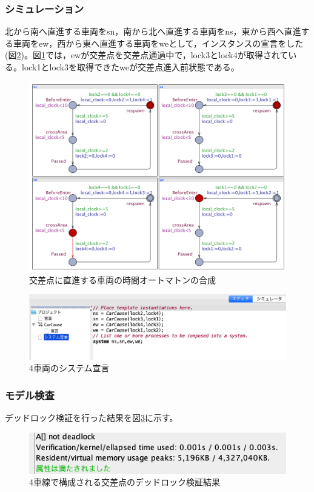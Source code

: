 \documentclass{tpu-sotu}
\begin{document}
	\subsubsection{シミュレーション}
	北から南へ直進する車両をsn，南から北へ直進する車両をns，東から西へ直進する車両をew，西から東へ直進する車両をweとして，インスタンスの宣言をした(図\ref{newsSD})。図\ref{newsS}では，ewが交差点を交差点通過中で，lock3とlock4が取得されている。lock1とlock3を取得できたweが交差点進入前状態である。
	\begin{figure}[htbp]
	\centering
	\includegraphics[width=130mm]{newsSimu.png}
	\caption{交差点に直進する車両の時間オートマトンの合成}
	\label{newsS}
	\end{figure}
	\begin{figure}[htbp]
	\centering
	\includegraphics[width=130mm]{newsSD.png}
	\caption{4車両のシステム宣言}
	\label{newsSD}
	\end{figure}
	\subsubsection{モデル検査}
	デッドロック検証を行った結果を図\ref{newsV}に示す。
	\begin{figure}[htbp]
	\centering
	\includegraphics[width=120mm]{newsV.png}
	\caption{4車線で構成される交差点のデッドロック検証結果}
	\label{newsV}
	\end{figure}
\end{document}
